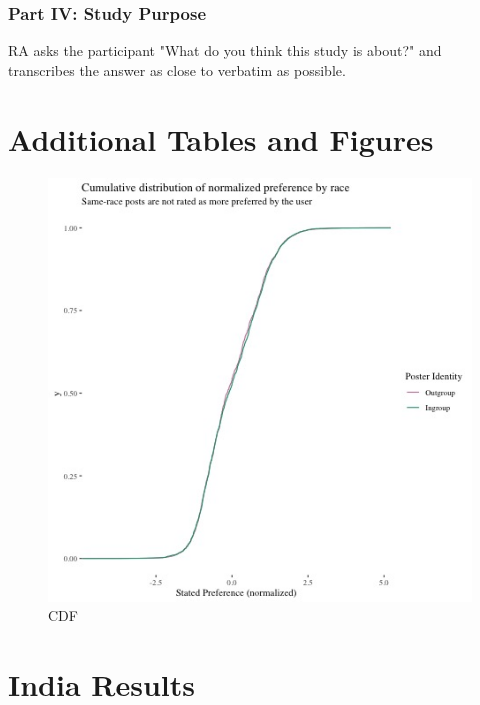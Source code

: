 \documentclass[12pt,letterpaper]{article}
\begin{document}
\subsubsection{Part IV: Study Purpose} RA asks the participant "What do you think this study is about?" and transcribes the answer as close to verbatim as possible.

\section{Additional Tables and Figures}\label{app:tab_fig}

\begin{figure}[!h]
    \centering
    \includegraphics[scale=.8]{Output/Graphs/Audit/Stated preferences/US NF cdf norm preferences by ingroup.jpg}
    \caption{CDF}
    \label{fig:prefcdf}
\end{figure}


\section{India Results}\label{app:india}
\end{document}
